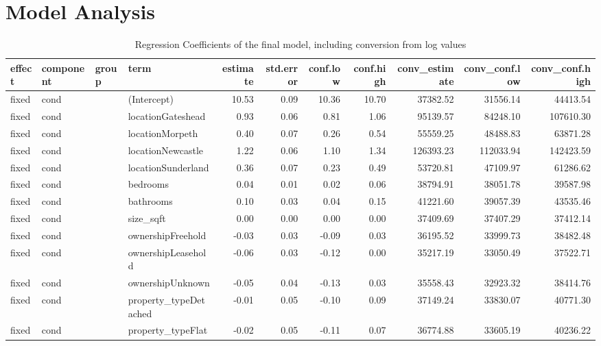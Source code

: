 \documentclass{scrartcl}
\begin{document}
\section{Model Analysis}
\begin{landscape}
	\begin{table}[htbp]
		\centering
		\caption{Regression Coefficients of the final model, including conversion from log values} 
		\label{tab:regcoef}
		\begin{adjustbox}{max width=\linewidth}
		\begin{tabular}{llllrrrrrrr}
			\hline
			effect & component & group & term & estimate & std.error & conf.low & conf.high & conv\_estimate & conv\_conf.low & conv\_conf.high \\ 
			\hline
			fixed & cond &  & (Intercept) & 10.53 & 0.09 & 10.36 & 10.70 & 37382.52 & 31556.14 & 44413.54 \\ 
			fixed & cond &  & locationGateshead & 0.93 & 0.06 & 0.81 & 1.06 & 95139.57 & 84248.10 & 107610.30 \\ 
			fixed & cond &  & locationMorpeth & 0.40 & 0.07 & 0.26 & 0.54 & 55559.25 & 48488.83 & 63871.28 \\ 
			fixed & cond &  & locationNewcastle & 1.22 & 0.06 & 1.10 & 1.34 & 126393.23 & 112033.94 & 142423.59 \\ 
			fixed & cond &  & locationSunderland & 0.36 & 0.07 & 0.23 & 0.49 & 53720.81 & 47109.97 & 61286.62 \\ 
			fixed & cond &  & bedrooms & 0.04 & 0.01 & 0.02 & 0.06 & 38794.91 & 38051.78 & 39587.98 \\ 
			fixed & cond &  & bathrooms & 0.10 & 0.03 & 0.04 & 0.15 & 41221.60 & 39057.39 & 43535.46 \\ 
			fixed & cond &  & size\_sqft & 0.00 & 0.00 & 0.00 & 0.00 & 37409.69 & 37407.29 & 37412.14 \\ 
			fixed & cond &  & ownershipFreehold & -0.03 & 0.03 & -0.09 & 0.03 & 36195.52 & 33999.73 & 38482.48 \\ 
			fixed & cond &  & ownershipLeasehold & -0.06 & 0.03 & -0.12 & 0.00 & 35217.19 & 33050.49 & 37522.71 \\ 
			fixed & cond &  & ownershipUnknown & -0.05 & 0.04 & -0.13 & 0.03 & 35558.43 & 32923.32 & 38414.76 \\ 
			fixed & cond &  & property\_typeDetached & -0.01 & 0.05 & -0.10 & 0.09 & 37149.24 & 33830.07 & 40771.30 \\ 
			fixed & cond &  & property\_typeFlat & -0.02 & 0.05 & -0.11 & 0.07 & 36774.88 & 33605.19 & 40236.22 \\ 

\end{tabular}
\end{adjustbox}
\end{table}
\end{landscape}
\end{document}
